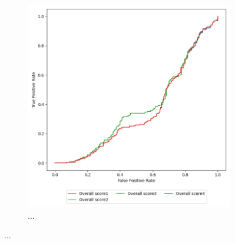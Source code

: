 \begin{figure}[H]
\begin{subfigure}[h]{0.5\linewidth}
        \includegraphics[width=1\linewidth]{other-fig/tests/asv_overall_score.png}
        \caption{...}
    \end{subfigure}
    \caption{...}
\end{figure}

